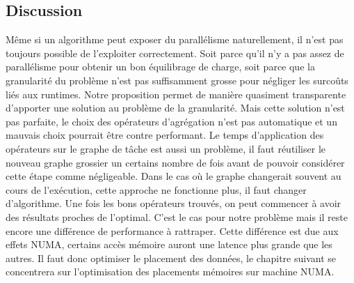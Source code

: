 \subsection{Discussion}
Même si un algorithme peut exposer du parallélisme naturellement, il n'est pas toujours possible de l'exploiter correctement.
%
Soit parce qu'il n'y a pas assez de parallélisme pour obtenir un bon équilibrage de charge, soit parce que la granularité du problème n'est pas suffisamment grosse pour négliger les surcoûts liés aux runtimes.
%
Notre proposition permet de manière quasiment transparente d'apporter une solution au problème de la granularité.
%
Mais cette solution n'est pas parfaite, le choix des opérateurs d'agrégation n'est pas automatique et un mauvais choix pourrait être contre performant.
%
Le temps d'application des opérateurs sur le graphe de tâche est aussi un problème, il faut réutiliser le nouveau graphe grossier un certains nombre de fois avant de pouvoir considérer cette étape comme négligeable.
%
Dans le cas où le graphe changerait souvent au cours de l'exécution, cette approche ne fonctionne plus, il faut changer d'algorithme.
%
Une fois les bons opérateurs trouvés, on peut commencer à avoir des résultats proches de l'optimal.
%
C'est le cas pour notre problème mais il reste encore une différence de performance à rattraper.
%
Cette différence est due aux effets NUMA, certains accès mémoire auront une latence plus grande que les autres.
%
Il faut donc optimiser le placement des données, le chapitre suivant se concentrera sur l'optimisation des placements mémoires sur machine NUMA.
